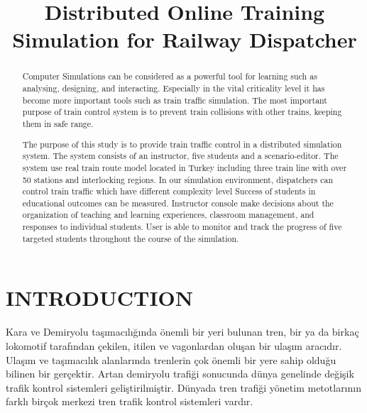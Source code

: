 \documentclass[conference]{IEEEtran}
\begin{document}
\title{Distributed Online Training Simulation for Railway Dispatcher }



\author{


}

\maketitle

\begin{abstract}
Computer Simulations can be considered as a powerful tool for learning such as analysing, designing, and interacting. Especially in the vital criticality level it has become more important tools such as train traffic simulation.
The most important purpose of train control system is to prevent train collisions with other trains, keeping them in safe range.

The purpose of this study is to provide train traffic control in a distributed simulation system. The system consists of an instructor, five students and a scenario-editor. The system use real train route model located in Turkey including three train line with over 50 stations and interlocking regions.  In our simulation environment, dispatchers can control train traffic which have different  complexity level Success of students in educational outcomes can be measured. Instructor console make decisions about the organization of teaching and learning experiences, classroom management, and responses to individual students. User is able to monitor and track the progress of five targeted students throughout the course of the simulation.

\end{abstract}

\section{INTRODUCTION}
Kara ve Demiryolu taşımacılığında önemli bir yeri bulunan tren, bir ya da birkaç lokomotif tarafından çekilen, itilen ve vagonlardan oluşan bir ulaşım aracıdır. Ulaşım ve taşımacılık alanlarında trenlerin çok önemli bir yere sahip olduğu bilinen bir gerçektir. 
Artan demiryolu trafiği sonucunda dünya genelinde değişik trafik kontrol sistemleri geliştirilmiştir. Dünyada tren trafiği yönetim metotlarının farklı birçok merkezi tren trafik kontrol sistemleri vardır.
\end{document}

